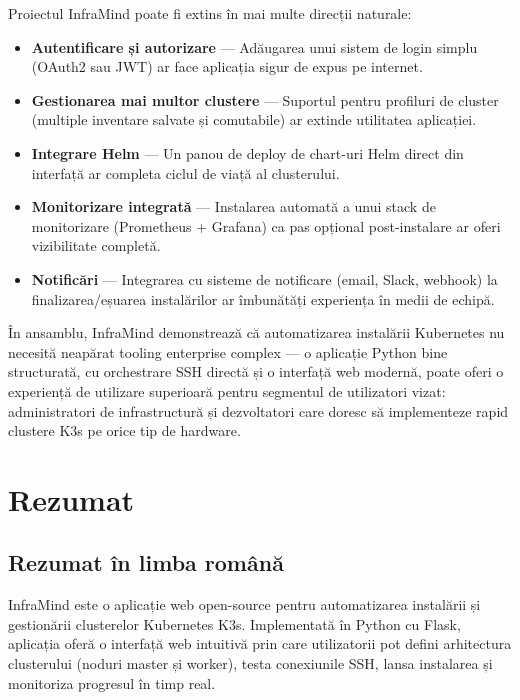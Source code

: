 \documentclass[12pt,a4paper]{report}
\begin{document}
Proiectul InfraMind poate fi extins în mai multe direcții naturale:

\begin{itemize}
  \item \textbf{Autentificare și autorizare} — Adăugarea unui sistem de login simplu (OAuth2 sau JWT) ar face aplicația sigur de expus pe internet.
  \item \textbf{Gestionarea mai multor clustere} — Suportul pentru profiluri de cluster (multiple inventare salvate și comutabile) ar extinde utilitatea aplicației.
  \item \textbf{Integrare Helm} — Un panou de deploy de chart-uri Helm direct din interfață ar completa ciclul de viață al clusterului.
  \item \textbf{Monitorizare integrată} — Instalarea automată a unui stack de monitorizare (Prometheus + Grafana) ca pas opțional post-instalare ar oferi vizibilitate completă.
  \item \textbf{Notificări} — Integrarea cu sisteme de notificare (email, Slack, webhook) la finalizarea/eșuarea instalărilor ar îmbunătăți experiența în medii de echipă.
\end{itemize}

În ansamblu, InfraMind demonstrează că automatizarea instalării Kubernetes nu necesită neapărat tooling enterprise complex — o aplicație Python bine structurată, cu orchestrare SSH directă și o interfață web modernă, poate oferi o experiență de utilizare superioară pentru segmentul de utilizatori vizat: administratori de infrastructură și dezvoltatori care doresc să implementeze rapid clustere K3s pe orice tip de hardware.

\chapter*{Rezumat}

\section*{Rezumat în limba română}

InfraMind este o aplicație web open-source pentru automatizarea instalării și gestionării clusterelor Kubernetes K3s. Implementată în Python cu Flask, aplicația oferă o interfață web intuitivă prin care utilizatorii pot defini arhitectura clusterului (noduri master și worker), testa conexiunile SSH, lansa instalarea și monitoriza progresul în timp real.
\end{document}
